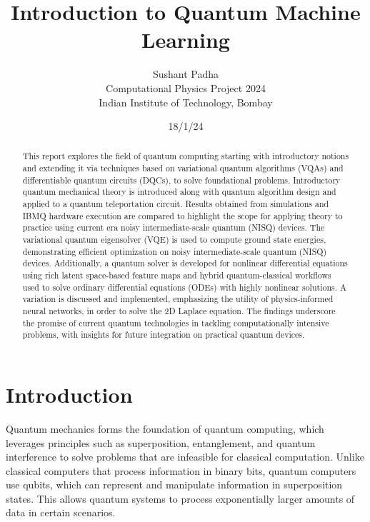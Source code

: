 \documentclass[11pt,a4paper]{article}
\title{Introduction to Quantum Machine Learning}
\begin{document}
\author{Sushant Padha \\
Computational Physics Project 2024\\
Indian Institute of Technology, Bombay\\
}
\date{18/1/24}

\maketitle
\tableofcontents
\listoffigures

\newpage
\begin{abstract}
This report explores the field of quantum computing starting with introductory notions and extending it via techniques based on variational quantum algorithms (VQAs) and differentiable quantum circuits (DQCs), to solve foundational problems. Introductory quantum mechanical theory is introduced along with quantum algorithm design and applied to a quantum teleportation circuit. Results obtained from simulations and IBMQ hardware execution are compared to highlight the scope for applying theory to practice using current era noisy intermediate-scale quantum (NISQ) devices. The variational quantum eigensolver (VQE) is used to compute ground state energies, demonstrating efficient optimization on noisy intermediate-scale quantum (NISQ) devices. Additionally, a quantum solver is developed for nonlinear differential equations using rich latent space-based feature maps and hybrid quantum-classical workflows used to solve ordinary differential equations (ODEs) with highly nonlinear solutions. A variation is discussed and implemented, emphasizing the utility of physics-informed neural networks, in order to solve the 2D Laplace equation. The findings underscore the promise of current quantum technologies in tackling computationally intensive problems, with insights for future integration on practical quantum devices. 

\end{abstract}

\section{Introduction}
Quantum mechanics forms the foundation of quantum computing, which leverages principles such as superposition, entanglement, and quantum interference to solve problems that are infeasible for classical computation. Unlike classical computers that process information in binary bits, quantum computers use qubits, which can represent and manipulate information in superposition states. This allows quantum systems to process exponentially larger amounts of data in certain scenarios.
\end{document}

